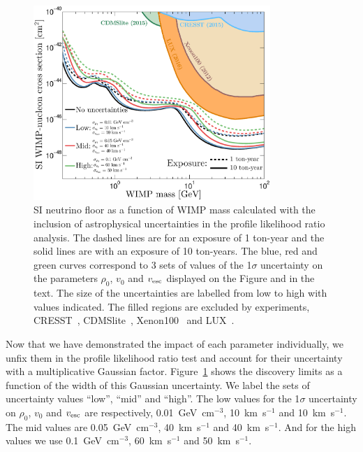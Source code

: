 \begin{figure}
\begin{center}
\includegraphics[trim = 0mm 0 0mm 0mm, clip, width=0.8\textwidth,angle=0]{Figures/DL_Uncertainties.eps}
\caption[Neutrino floor with the inclusion of astrophysical uncertainties]{SI neutrino floor as a function of WIMP mass calculated with the inclusion of astrophysical uncertainties in the profile likelihood ratio analysis. The dashed lines are for an exposure of 1 ton-year and the solid lines are with an exposure of 10 ton-years. The blue, red and green curves correspond to 3 sets of values of the 1$\sigma$ uncertainty on the parameters $\rho_0$, $v_0$ and $v_{\rm esc}$ displayed on the Figure and in the text. The size of the uncertainties are labelled from low to high with values indicated. The filled regions are excluded by experiments, CRESST~\cite{Angloher:2015ewa}, CDMSlite~\cite{Agnese:2015nto}, Xenon100~\cite{Aprile:2012nq} and LUX~\cite{Akerib:2016vxi}.}
\label{fig:DL_uncertainties}
\end{center}
\end{figure}
Now that we have demonstrated the impact of each parameter individually, we unfix them in the profile likelihood ratio test and account for their uncertainty with a multiplicative Gaussian factor. Figure~\ref{fig:DL_uncertainties} shows the discovery limits as a function of the width of this Gaussian uncertainty. We label the sets of uncertainty values ``low'', ``mid'' and ``high''. The low values for the 1$\sigma$ uncertainty on $\rho_0$, $v_0$ and $v_{\rm esc}$ are respectively, 0.01~GeV~cm$^{-3}$, 10~km~s$^{-1}$ and 10~km~s$^{-1}$. The mid values are 0.05~GeV~cm$^{-3}$, 40~km~s$^{-1}$ and 40~km~s$^{-1}$. And for the high values we use 0.1~GeV~cm$^{-3}$, 60~km~s$^{-1}$ and 50~km~s$^{-1}$.

